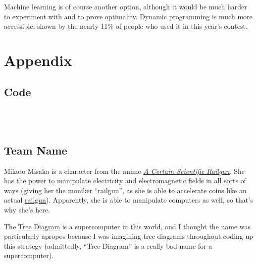 \documentclass[11pt, oneside]{article}
\begin{document}
Machine learning is of course another option, although it would be much harder
to experiment with and to prove optimality.
Dynamic programming is much more accessible, shown by the nearly 11\%
of people who used it in this year's contest. 

\newpage

\section{Appendix}
\subsection{Code}

\inputminted[linenos=true, fontsize=\tiny, label=hoglib.py]{Python}{programs/hoglib.py}
\newpage
\inputminted[linenos=true, fontsize=\tiny, label=compare.py]{Python}{programs/compare.py}
\newpage
\inputminted[linenos=true, fontsize=\scriptsize, label=final.py]{Python}{programs/final.py}
\newpage
\inputminted[linenos=true, fontsize=\footnotesize, label=final\_strategy.py]{Python}{programs/final_strategy.py}

\subsection{Team Name}

Mikoto Misaka is a character from the anime 
\href{https://myanimelist.net/anime/6213/Toaru_Kagaku_no_Railgun}
{\textit{A Certain Scientific Railgun}}.
She has the power to manipulate electricity and electromagnetic fields 
in all sorts of ways (giving her the moniker ``railgun'', as 
she is able to accelerate coins like an actual 
\href{https://en.wikipedia.org/wiki/Railgun}{railgun}).
Apparently, she is able to manipulate computers as well,
so that's why she's here.

The \href{https://toarumajutsunoindex.fandom.com/wiki/Tree_Diagram}{Tree Diagram}
is a supercomputer in this world, and I thought the name was 
particularly apropos because I was imagining tree diagrams throughout 
coding up this strategy (admittedly, ``Tree Diagram''
is a really bad name for a supercomputer).
\end{document}
